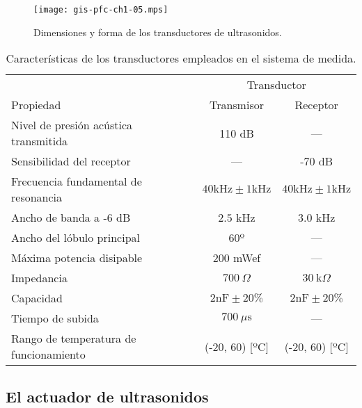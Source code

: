 \begin{figure}
	\begin{center}
		\texttt{[image: gis-pfc-ch1-05.mps]}
	\end{center}
	\caption[Dimensiones de los transductores de
	ultrasonidos]{Dimensiones y forma de los transductores de
	ultrasonidos.}
	\label{fig:transducers}
\end{figure}

\begin{sidewaystable}
	\centering
	\begin{threeparttable}
	\begin{tabular}{l c c}
		\toprule
		& \multicolumn{2}{c}{Transductor} \\
		\cmidrule(l){2-3}
		Propiedad & Transmisor & Receptor \\
		\midrule
		Nivel de presión acústica transmitida & 110 dB & --- \\
		Sensibilidad del receptor & --- & -70 dB \\
		Frecuencia fundamental de resonancia
		& $40 \text{kHz} \pm 1 \text{kHz}$
		& $40 \text{kHz} \pm 1 \text{kHz}$ \\
		Ancho de banda a -6 dB & $2.5$ kHz & $3.0$ kHz \\
		Ancho del lóbulo principal & 60º & --- \\
		Máxima potencia disipable & 200 mWef & --- \\
		Impedancia & $700\ \Omega$ & $30\ \text{k}\Omega$ \\
		Capacidad & $2 \text{nF} \pm 20\%$
		& $2 \text{nF} \pm 20\%$ \\
		Tiempo de subida & $700\ \mu\text{s}$ & --- \\
		Rango de temperatura de funcionamiento %
		& (-20, 60) [ºC] & (-20, 60) [ºC] \\
		\bottomrule
	\end{tabular}
	\begin{TableNotes}
	\end{TableNotes}
	\end{threeparttable}
	\caption[Características de los transductores]{Características de
	los transductores empleados en el sistema de medida.}
	\label{tab:transducers}
\end{sidewaystable}


\subsection{El actuador de ultrasonidos}

